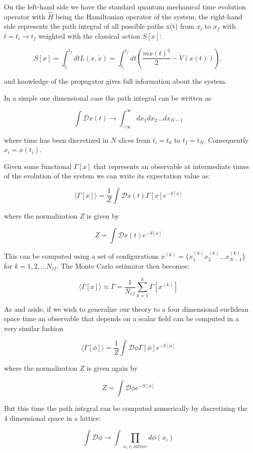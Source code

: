 \documentclass[%
oneside,                 %
final,                   %
10pt]{article}
\begin{document}
On the left-hand side we have the standard quantum mechanical time
evolution operator with $\hat{H}$ being the Hamiltonian operator of
the system, the right-hand side represents the path integral of all possible paths
x(t) from $x_i$ to $x_f$ with $t = t_i \rightarrow t_f$ weighted with
the classical action $S[x]$:

\[
	S[x] = \int_{t_i}^{t_f} dt L(x,\dot{x}) =  \int_{t_i}^{t_f} dt \left( \frac{m\dot{x}(t)^2}{2} - V(x(t))\right),
\]

and  knowledge of the propagator gives full information about the system.

In a simple one dimensional case the path integral can be written as

\[
	 \int \mathcal{D} x(t) \rightarrow \int_{-\infty}^{\infty} dx_1dx_2\dots dx_{N-1}
\]

where time has been discretized in $N$ slices from $t_i = t_0$ to $t_f = t_N$. Consequently $x_i = x(t_i)$.  

Given some functional $\Gamma[x]$ that represents an observable at
intermediate times of the evolution of the system we can write its
expectation value as:

\[
	\langle\Gamma[x]\rangle = \frac{1}{Z} \int \mathcal{D} x(t) \Gamma[x] e^{-S[x]}
\]

where the normalization $Z$ is given by 

\[
	Z = \int \mathcal{D} x(t) e^{-S[x]}
\]

This can be computed using a set of configurations $x^{(k)} =
\{x^{(k)}_1x^{(k)}_2\dots x^{(k)}_{N-1} \}$ for $k = 1,2,\dots
N_{cf}$. The Monte Carlo estimator then becomes:

\[
	\langle\Gamma[x]\rangle \approx \bar{\Gamma} = \frac{1}{N_{cf}} \sum_{k = 1}^k \Gamma[x^{(k)}]
\]

As and aside, if we wish to  generalize our theory to a four dimensional
euclidean space time an observable that depends on a scalar field can
be computed in a very similar fashion

\[
	\langle\Gamma[\phi]\rangle = \frac{1}{Z} \int \mathcal{D} \phi \Gamma[\phi] e^{-S[\phi]}
\]

where the normalization $Z$ is given again by 

\[
	Z = \int \mathcal{D} \phi e^{-S[\phi]}
\]

But this time the path integral can be computed numerically by discretizing the 4 dimensional space in a lattice:

\[
	 \int \mathcal{D} \phi \rightarrow \int \prod_{x_i \in lattice} d\phi(x_i)
\] 
\end{document}
